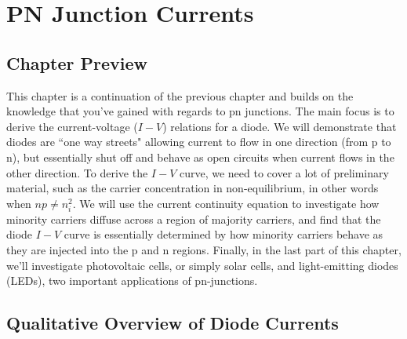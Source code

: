 \chapter{PN Junction Currents}
\graphicspath{{./figs_pn_currents/}}
\section{Chapter Preview}
This chapter is a continuation of the previous chapter and builds on the knowledge that you've gained with regards to pn junctions.  The main focus is to derive the current-voltage ($I-V$) relations  for a diode.  We will demonstrate that diodes are ``one way streets" allowing current to flow in one direction (from p to n), but essentially shut off and behave as open circuits when current flows in the other direction.  To derive the $I-V$ curve, we need to cover a lot of preliminary material, such as the carrier concentration in non-equilibrium, in other words when $n p \neq n_i^2$.  We will use the current continuity equation to investigate how minority carriers diffuse across a region of majority carriers, and find that the diode $I-V$ curve is essentially determined by how minority carriers behave as they are injected into the p and n regions.  Finally, in the last part of this chapter, we'll investigate photovoltaic cells, or simply solar cells, and light-emitting diodes (LEDs), two important applications of pn-junctions.
\section{Qualitative Overview of Diode Currents}
